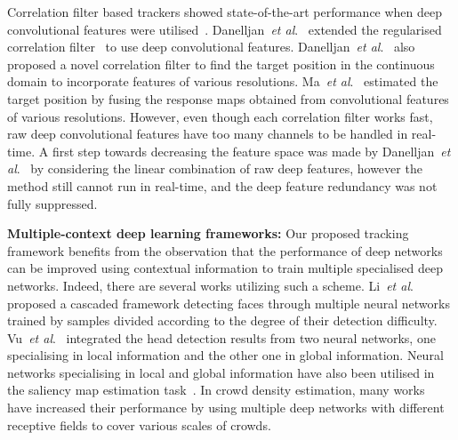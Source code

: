 \documentclass[10pt,twocolumn,letterpaper]{article}
\def\etal{\emph{et al}.}
\begin{document}
Correlation filter based trackers showed state-of-the-art performance when deep convolutional features were utilised~\cite{ref:HDT,ref:DeepSRDCF,ref:COT,ref:ECO}.
Danelljan~\etal~\cite{ref:DeepSRDCF} extended the regularised correlation filter~\cite{ref:SRDCF} to use deep convolutional features.
Danelljan~\etal~\cite{ref:COT} also proposed a novel correlation filter to find the target position in the continuous domain to incorporate features of various resolutions.
Ma~\etal~\cite{ref:HDT} estimated the target position by fusing the response maps obtained from convolutional features of various resolutions.
However, even though each correlation filter works fast, raw deep convolutional features have too many channels to be handled in real-time.
A first step towards decreasing the feature space was made by Danelljan~\etal~\cite{ref:ECO} by considering the linear combination of raw deep features, however the method still cannot run in real-time, and the deep feature redundancy was not fully suppressed.






\textbf{Multiple-context deep learning frameworks:}
Our proposed tracking framework benefits from the observation that the performance of deep networks can be improved using contextual information to train multiple specialised deep networks. Indeed, there are several works utilizing such a scheme.
Li~\etal~\cite{ref:context_cascadeface} proposed a cascaded framework detecting faces through multiple neural networks trained by samples divided according to the degree of their detection difficulty.
Vu~\etal~\cite{ref:context_head} integrated the head detection results from two neural networks, one specialising in local information and the other one in global information.
Neural networks specialising in local and global information have also been utilised in the saliency map estimation task~\cite{ref:context_saliency, ref:context_saliency2}.
In crowd density estimation, many works~\cite{ref:crowd1, ref:crowd2, ref:crowd3} have increased their performance by using multiple deep networks with different receptive fields to cover various scales of crowds.
\end{document}
